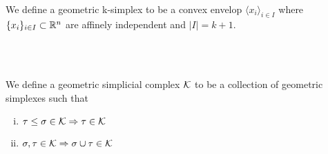 \documentclass[../1.tex]{subfiles}
\begin{document}
    \begin{defn}
        \\
        We define a geometric k-simplex to be a convex envelop $\langle x_i \rangle_{i \in I}$
        where $\{x_i\}_{i \in I} \subset \mathbb{R}^n$ are affinely independent and $|I| = k + 1$.
    \end{defn}
    \begin{defn}
        \\
    \end{defn}
    \begin{defn}
        \\
        We define a geometric simplicial complex $\mathcal{K}$ to be a collection of geometric simplexes such that
        \begin{enumerate}[(i)]
            \item $ \tau \leq \sigma \in \mathcal{K} \Rightarrow \tau \in \mathcal{K} $
            \item $ \sigma, \tau \in \mathcal{K} \Rightarrow \sigma \cup \tau \in \mathcal{K}  $
        \end{enumerate}
    \end{defn}
    \begin{thm}
        \\
    \end{thm}
\end{document}
